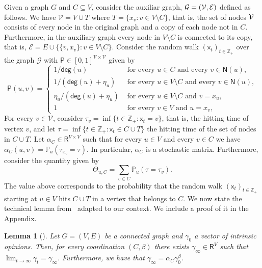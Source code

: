 \documentclass[letterpaper,11pt]{article}
\newcommand{\PP}{\mathbb{P}}
\newcommand{\RR}{\mathsf{R}}
\newcommand{\ZZ}{\mathbb{Z}}
\newcommand{\nsf}{\mathsf{N}}
\newcommand{\degsf}{\mathsf{deg}}
\newcommand{\psf}{\mathsf{P}}
\newcommand{\xsf}{\mathsf{x}}
\newtheorem{lemma}{Lemma}
\newcommand{\vvcom}[1]{\todo[color=red!25!white]{Victor: #1}}
\begin{document}
 Given a graph $G$ and $C\subseteq V$, consider the auxiliar graph, $\cal{G}=(\cal{V},\cal{E})$ defined as follows. 
We have $\mathcal{V}=V\cup T$ where $T=\{x_v:v\in V\setminus C\}$, that is, the set of nodes $\cal{V}$ consists of every node in the original graph and a copy of each node not in $C$. 
Furthermore, in the auxiliary graph every node in $V\setminus C$ is connected to its copy, that is, $\mathcal{E}=E\cup \{\{v,x_v\}:v\in V\setminus C\}$.
Consider the random walk $(\xsf_t)_{t\in \ZZ_+}$ over the graph $\mathcal{G}$ with $\psf\in [0,1]^{\mathcal{V}\times \mathcal{V}}$ given by
\[
\psf(u,v)=
\begin{cases}
1/\degsf(u) & \text{ for every }u\in C\text{ and every }v\in \nsf(u),\\
1/(\degsf(u)+\eta_u)& \text{ for every }u\in V\setminus C\text{ and every }v\in \nsf(u),\\
\eta_u/(\degsf(u)+\eta_u) & \text{ for every }u\in V\setminus C\text{ and }v=x_u,\\
1 & \text{ for every }v\in V\text{ and }u=x_v,
\end{cases}
\]
For every $v\in \mathcal{V}$, consider $\tau_v=\inf\{t\in \ZZ_+:\xsf_t=v\}$, that is, the hitting time of vertex $v$, and let $\tau=\inf\{t\in \ZZ_+:\xsf_t\in C\cup T\}$ the hitting time of the set of nodes in $C\cup T$.
Let $\alpha_C\in \RR^{V\times V}$ such that for every $u\in V$ and every $v\in C$ we have $\alpha_C(u,v)=\PP_u(\tau_{x_v}=\tau)$. 
In particular, $\alpha_C$ is a stochastic matrix.
Furthermore, consider the quantity given by
\begin{equation*}
\Theta_{u,C}=\sum_{v\in C}\PP_u(\tau=\tau_{v}).
\end{equation*}
The value above corresponds to the probability that the random walk $(\xsf_t)_{t\in \ZZ_+}$ starting at $u\in V$ hits $C\cup T$ in a vertex that belongs to $C$.
We now state the technical lemma from~\cite{} adapted to our context.
We include a proof of it in the Appendix. 
\begin{lemma}[\cite{GS12}]
\label{lem:limit-thm}
Let $G=(V,E)$ be a connected graph and $\gamma_0$ a vector of intrinsic opinions. 
Then, for every coordination $(C,\beta)$ there exists $\gamma_{\infty}\in \RR^V$ such that $\displaystyle\lim_{t\to \infty}\gamma_t=\gamma_{\infty}$.
Furthermore, we have that $\gamma_{\infty}=\alpha_C \gamma_0^{\beta}$.
\end{lemma}
\end{document}
